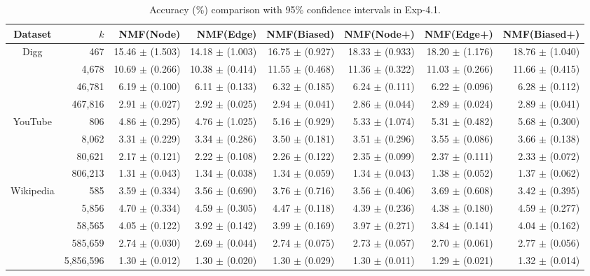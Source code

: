 \documentclass[10pt,journal,compsoc]{IEEEtran}
\newcommand{\Node}{{\sf NMF(Node)}\xspace}
\newcommand{\Edge}{{\sf NMF(Edge)}\xspace}
\newcommand{\Biased}{{\sf NMF(Biased)}\xspace}
\newcommand{\Digg}{{\sf Digg}\xspace}
\newcommand{\YouTube}{{\sf YouTube}\xspace}
\newcommand{\Wikipedia}{{\sf Wikipedia}\xspace}
\newcommand{\Nodep}{{\sf NMF(Node+)}\xspace}
\newcommand{\Edgep}{{\sf NMF(Edge+)}\xspace}
\newcommand{\Biasedp}{{\sf NMF(Biased+)}\xspace}
\begin{document}
\begin{table}
\caption{Accuracy (\%) comparison with 95\% confidence intervals in Exp-4.1.}
\label{tab_accuracy_5}
\vspace{-2ex}
\centering
\newcommand{\tabincell}[2]{\begin{tabular}{@{}#1@{}}#2\end{tabular}}
\begin{tabular}{c|r|r|r|r|r|r|r}
\hline \hline Dataset  & \hspace*{\stretch{1}} $k$ \hspace*{\stretch{1}} & \Node & \Edge & \Biased & \Nodep & \Edgep & \Biasedp  \\
\hline
\multirow{4}{*}{\Digg}
 & 467     & 15.46 $\pm$ (1.503) & 14.18 $\pm$ (1.003) & 16.75 $\pm$ (0.927) & 18.33 $\pm$ (0.933) & 18.20 $\pm$ (1.176) & 18.76 $\pm$ (1.040) \\
 & 4,678   & 10.69 $\pm$ (0.266) & 10.38 $\pm$ (0.414) & 11.55 $\pm$ (0.468) & 11.36 $\pm$ (0.322) & 11.03 $\pm$ (0.266) & 11.66 $\pm$ (0.415)  \\
 & 46,781  & 6.19 $\pm$ (0.100) & 6.11 $\pm$ (0.133) & 6.32 $\pm$ (0.185) & 6.24 $\pm$ (0.111) & 6.22 $\pm$ (0.096) & 6.28 $\pm$ (0.112)  \\
 & 467,816 & 2.91 $\pm$ (0.027) & 2.92 $\pm$ (0.025) & 2.94 $\pm$ (0.041) & 2.86 $\pm$ (0.044) & 2.89 $\pm$ (0.024) & 2.89 $\pm$ (0.041) \\
\hline
\multirow{4}{*}{\YouTube}
 & 806     & 4.86 $\pm$ (0.295) & 4.76 $\pm$ (1.025) & 5.16 $\pm$ (0.929) & 5.33 $\pm$ (1.074) & 5.31 $\pm$ (0.482) & 5.68 $\pm$ (0.300)  \\
 & 8,062   & 3.31 $\pm$ (0.229) & 3.34 $\pm$ (0.286) & 3.50 $\pm$ (0.181) & 3.51 $\pm$ (0.296) & 3.55 $\pm$ (0.086) & 3.66 $\pm$ (0.138)  \\
 & 80,621  & 2.17 $\pm$ (0.121) & 2.22 $\pm$ (0.108) & 2.26 $\pm$ (0.122) & 2.35 $\pm$ (0.099) & 2.37 $\pm$ (0.111) & 2.33 $\pm$ (0.072)  \\
 & 806,213 & 1.31 $\pm$ (0.043) & 1.34 $\pm$ (0.038) & 1.34 $\pm$ (0.059) & 1.34 $\pm$ (0.043) & 1.38 $\pm$ (0.052) & 1.37 $\pm$ (0.062) \\
\hline
\multirow{5}{*}{\Wikipedia}
 & 585       & 3.59 $\pm$ (0.334) & 3.56 $\pm$ (0.690) & 3.76 $\pm$ (0.716) & 3.56 $\pm$ (0.406) & 3.69 $\pm$ (0.608) & 3.42 $\pm$ (0.395)  \\
 & 5,856     & 4.70 $\pm$ (0.334) & 4.59 $\pm$ (0.305) & 4.47 $\pm$ (0.118) & 4.39 $\pm$ (0.236) & 4.38 $\pm$ (0.180) & 4.59 $\pm$ (0.277)  \\
 & 58,565    & 4.05 $\pm$ (0.122) & 3.92 $\pm$ (0.142) & 3.99 $\pm$ (0.169) & 3.97 $\pm$ (0.271) & 3.84 $\pm$ (0.141) & 4.04 $\pm$ (0.162)  \\
 & 585,659   & 2.74 $\pm$ (0.030) & 2.69 $\pm$ (0.044) & 2.74 $\pm$ (0.075) & 2.73 $\pm$ (0.057) & 2.70 $\pm$ (0.061) & 2.77 $\pm$ (0.056) \\
 & 5,856,596 & 1.30 $\pm$ (0.012) & 1.30 $\pm$ (0.020) & 1.30 $\pm$ (0.029) & 1.30 $\pm$ (0.011) & 1.29 $\pm$ (0.021) & 1.32 $\pm$ (0.014)  \\
\hline \hline
\end{tabular}
\vspace{-2ex}
\end{table}
\end{document}
